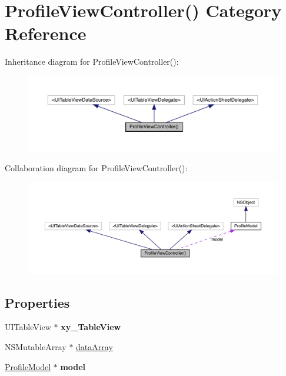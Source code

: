 \hypertarget{category_profile_view_controller_07_08}{}\section{Profile\+View\+Controller() Category Reference}
\label{category_profile_view_controller_07_08}


Inheritance diagram for Profile\+View\+Controller()\+:\nopagebreak
\begin{figure}[H]
\begin{center}
\leavevmode
\includegraphics[width=350pt]{category_profile_view_controller_07_08__inherit__graph}
\end{center}
\end{figure}


Collaboration diagram for Profile\+View\+Controller()\+:\nopagebreak
\begin{figure}[H]
\begin{center}
\leavevmode
\includegraphics[width=350pt]{category_profile_view_controller_07_08__coll__graph}
\end{center}
\end{figure}
\subsection*{Properties}
\begin{DoxyCompactItemize}
\item 
\mbox{\label{category_profile_view_controller_07_08_add45a4e68cce76b1db22868c11baaac7}} 
U\+I\+Table\+View $\ast$ {\bfseries xy\+\_\+\+Table\+View}
\item 
N\+S\+Mutable\+Array $\ast$ \mbox{\hyperlink{category_profile_view_controller_07_08_a94bce918827c2d557748482fa1f8811d}{data\+Array}}
\item 
\mbox{\label{category_profile_view_controller_07_08_acf9209fd1b0b1baee59f65c1796b933c}} 
\mbox{\hyperlink{interface_profile_model}{Profile\+Model}} $\ast$ {\bfseries model}
\end{DoxyCompactItemize}


